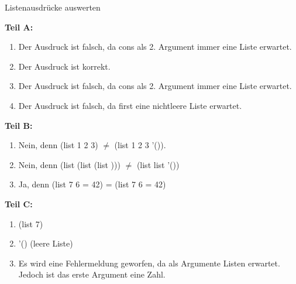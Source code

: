 \documentclass{../preamble}
\begin{document}
\begin{task}[credit = \stars{1}{3}]{Listenausdrücke auswerten}
	    \begin{solution}
	        {\large\textbf{Teil A:}}
	        \begin{enumerate}
	            \item Der Ausdruck ist falsch, da \textcolor{keywordcolor}{cons} als 2. Argument immer eine Liste erwartet.
	            \item Der Ausdruck ist korrekt.
	            \item Der Ausdruck ist falsch, da \textcolor{keywordcolor}{cons} als 2. Argument immer eine Liste erwartet.
	            \item Der Ausdruck ist falsch, da \textcolor{keywordcolor}{first} eine nichtleere Liste erwartet.
	        \end{enumerate}
	        {\large\textbf{Teil B:}}
	        \begin{enumerate}
	            \item Nein, denn (\textcolor{keywordcolor}{list} 1 2 3) \(\neq\) (list 1 2 3 \textcolor{keywordcolor}{'()}).
	            \item Nein, denn (\textcolor{keywordcolor}{list} (\textcolor{keywordcolor}{list} \grqq (list )\grqq)) \(\neq\) (\textcolor{keywordcolor}{list} \grqq list\grqq{} \textcolor{keywordcolor}{'()})
	            \item Ja, denn (\textcolor{keywordcolor}{list} 7 \grqq *\grqq{} 6 \grqq =\grqq{} 42) = (\textcolor{keywordcolor}{list} 7 \grqq *\grqq{} 6 \grqq =\grqq{} 42)
	        \end{enumerate}
	        {\large\textbf{Teil C:}}
	        \begin{enumerate}
	            \item (\textcolor{keywordcolor}{list} 7)
	            \item \textcolor{keywordcolor}{'()} (leere Liste)
	            \item Es wird eine Fehlermeldung geworfen, da  als Argumente Listen erwartet. Jedoch ist das erste Argument eine Zahl.
	        \end{enumerate}
	    \end{solution}
	\end{task}
	
	\clearpage
	
\end{document}

